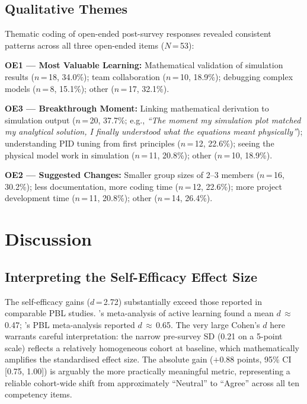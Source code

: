 \documentclass[12pt, a4paper]{article}
\begin{document}
\subsection{Qualitative Themes}

Thematic coding of open-ended post-survey responses revealed
consistent patterns across all three open-ended items ($N$\,=\,53):

\textbf{OE1 --- Most Valuable Learning:} Mathematical validation
of simulation results ($n$\,=\,18, 34.0\%); team collaboration
($n$\,=\,10, 18.9\%); debugging complex models ($n$\,=\,8,
15.1\%); other ($n$\,=\,17, 32.1\%).

\textbf{OE3 --- Breakthrough Moment:} Linking mathematical
derivation to simulation output ($n$\,=\,20, 37.7\%;
e.g., \textit{``The moment my simulation plot matched my
analytical solution, I finally understood what the equations meant
physically''}); understanding PID tuning from first principles
($n$\,=\,12, 22.6\%); seeing the physical model work in simulation
($n$\,=\,11, 20.8\%); other ($n$\,=\,10, 18.9\%).

\textbf{OE2 --- Suggested Changes:} Smaller group sizes of 2--3
members ($n$\,=\,16, 30.2\%); less documentation, more coding time
($n$\,=\,12, 22.6\%); more project development time ($n$\,=\,11,
20.8\%); other ($n$\,=\,14, 26.4\%).

\section{Discussion}

\subsection{Interpreting the Self-Efficacy Effect Size}

The self-efficacy gains ($d$\,=\,2.72) substantially exceed those
reported in comparable PBL studies. \citet{freeman2014active}'s
meta-analysis of active learning found a mean $d$\,$\approx$\,0.47;
\citet{dochy2003effects}'s PBL meta-analysis reported
$d$\,$\approx$\,0.65. The very large Cohen's $d$ here warrants
careful interpretation: the narrow pre-survey SD (0.21 on a
5-point scale) reflects a relatively homogeneous cohort at
baseline, which mathematically amplifies the standardised effect
size. The absolute gain ($+$0.88 points, 95\% CI [0.75, 1.00]) is
arguably the more practically meaningful metric, representing a
reliable cohort-wide shift from approximately ``Neutral'' to
``Agree'' across all ten competency items.
\end{document}
